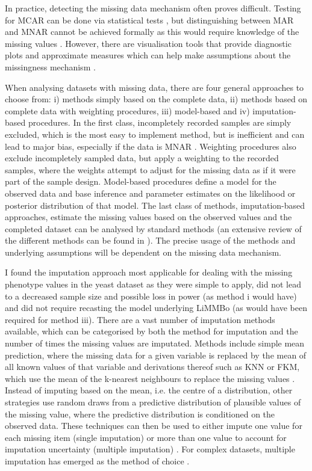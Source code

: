 In practice, detecting the missing data mechanism often proves difficult. Testing for MCAR can be done via statistical tests \citep{Little1988}, but distinguishing between MAR and MNAR cannot be achieved formally as this would require knowledge of the missing values \citep{Little2002,vanBuuren2011}. However, there are visualisation tools that provide diagnostic plots and approximate measures which can help make assumptions about the missingness mechanism \citep{Templ2012,Garson2015}. 

When analysing datasets with missing data, there are four general approaches to choose from:  i) methods simply based on the complete data, ii) methods based on complete data with weighting procedures, iii) model-based and iv) imputation-based procedures. In the first class, incompletely recorded samples are simply excluded, which is the most easy to implement method, but is inefficient and can lead to major bias, especially if the data is MNAR \citep{Little2002}. Weighting procedures also exclude incompletely sampled data, but apply a weighting to the recorded samples, where the weights attempt to adjust for the missing data as if it were part of the sample design. Model-based procedures define a model for the observed data and base inference and parameter estimates on the likelihood or posterior distribution of that model. The last class of methods, imputation-based approaches, estimate the missing values based on the observed values and the completed dataset can be analysed by standard methods (an extensive review of the different methods can be found in \citep{Rubin2002}). The precise usage of the methods and underlying assumptions will be dependent on the missing data mechanism. 

I found the imputation approach most applicable for dealing with the missing phenotype values in the yeast dataset as they were simple to apply, did not lead to a decreased sample size and possible loss in power (as method i would have) and did not require recasting the model underlying LiMMBo (as would have been required for method iii). There are a vast number of imputation methods available, which can be categorised by both the method for imputation and the number of times the missing values are imputated. Methods include simple mean prediction, where the missing data for a given variable is replaced by the mean of all known values of that variable and derivations thereof such as KNN or FKM, which use the mean of the k-nearest neighbours to replace the missing values \citep{Troyanskaya200,Li2004}. Instead of imputing based on the mean, i.e. the centre of a distribution, other strategies use random draws from a predictive distribution of plausible values of the missing value, where the predictive distribution is conditioned on the observed data. These techniques can then be used to either impute one value for each missing item (single imputation) or more than one value to account for imputation uncertainty (multiple imputation) \citep{Rubin2002}. For complex datasets, multiple imputation has emerged as the method of choice \citep{Rubin1987,Schafer1997}. 

